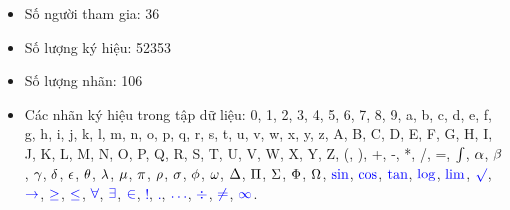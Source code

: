 \documentclass[a4paper]{article}
\theoremstyle{definition}
\begin{document}
	\begin{itemize}
		\item Số người tham gia: 36
		\item Số lượng ký hiệu: 52353
		\item Số lượng nhãn: 106
		\item Các nhãn ký hiệu trong tập dữ liệu: 0, 1, 2, 3, 4, 5, 6, 7, 8, 9, a, b, c, d, e, f, g, h, i, j, k, l, m, n, o, p, q, r, s, t, u, v, w, x, y, z, A, B, C, D, E, F, G, H, I, J, K, L, M, N, O, P, Q, R, S, T, U, V, W, X, Y, Z, (, ), +, -, *, /, =, $\textcolor{black}{\int}$, $\textcolor{black}{\alpha}$, $\textcolor{black}{\beta}$, $\textcolor{black}{\gamma}$, $\textcolor{black}{\delta}$, $\textcolor{black}{\epsilon}$, $\textcolor{black}{\theta}$, $\textcolor{black}{\lambda}$, $\textcolor{black}{\mu}$, $\textcolor{black}{\pi}$, $\textcolor{black}{\rho}$, $\textcolor{black}{\sigma}$, $\textcolor{black}{\phi}$, $\textcolor{black}{\omega}$, $\textcolor{black}{\Delta}$, $\textcolor{black}{\Pi}$, $\textcolor{black}{\Sigma}$, $\textcolor{black}{\Phi}$, $\textcolor{black}{\Omega}$, $\textcolor{blue}{\sin}$, $\textcolor{blue}{\cos}$, $\textcolor{blue}{\tan}$, $\textcolor{blue}{\log}$, $\textcolor{blue}{\lim}$, $\textcolor{blue}{\surd}$, $\textcolor{blue}{\rightarrow}$, $\textcolor{blue}{\geq}$, $\textcolor{blue}{\leq}$, $\textcolor{blue}{\forall}$, $\textcolor{blue}{\exists}$, $\textcolor{blue}{\in}$, \textcolor{blue}{!}, \textcolor{blue}{.}, $\textcolor{blue}{\ldots}$, $\textcolor{blue}{\div}$, $\textcolor{blue}{\neq}$, $\textcolor{blue}{\infty}$.
		
	\end{itemize}
\end{document}
